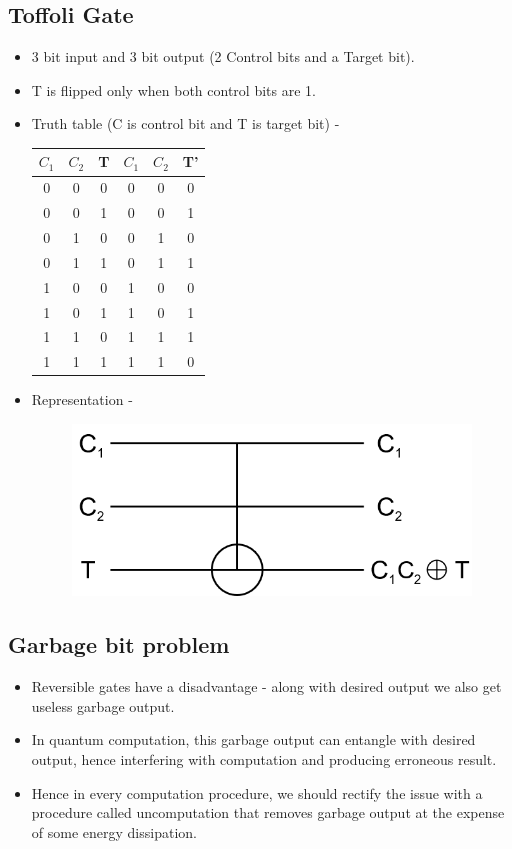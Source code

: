 \documentclass[11.5pt, paper=a4]{article}
\theoremstyle{definition}
\numberwithin{theorem}{section}
\begin{document}
\subsection{Toffoli Gate}
\begin{itemize}
        \item 3 bit input and 3 bit output (2 Control bits and a Target bit).
        \item T is flipped only when both control bits are 1.
        \item Truth table (C is control bit and T is target bit) -
            \begin{center}
            \begin{tabular}{ |c|c|c|c|c|c| }
            \hline
            $C_1$ & $C_2$ & T & $C_1$ & $C_2$ & T'\\
            \hline
            0 & 0 & 0 & 0 & 0 & 0\\
            0 & 0 & 1 & 0 & 0 & 1\\
            0 & 1 & 0 & 0 & 1 & 0\\
            0 & 1 & 1 & 0 & 1 & 1\\
            1 & 0 & 0 & 1 & 0 & 0\\
            1 & 0 & 1 & 1 & 0 & 1\\
            1 & 1 & 0 & 1 & 1 & 1\\
            1 & 1 & 1 & 1 & 1 & 0\\
            \hline
            \end{tabular}
            \end{center}
        \item Representation -
        \begin{figure}[h]
            \centering
            \includegraphics[scale=0.3]{Toffoli.png}
        \end{figure}
    \end{itemize}
\subsection{Garbage bit problem}
\begin{itemize}
    \item Reversible gates have a disadvantage - along with desired output we also get useless garbage output.
    \item In quantum computation, this garbage output can entangle with desired output, hence interfering with computation and producing erroneous result.
    \item Hence in every computation procedure, we should rectify the issue with a procedure called uncomputation that removes garbage output at the expense of some energy dissipation.
\end{itemize}
\end{document}
